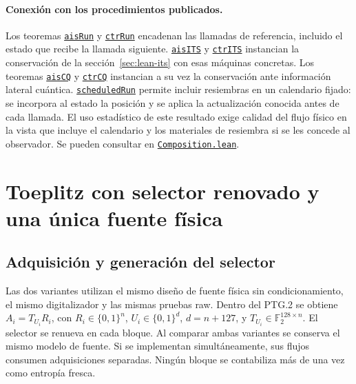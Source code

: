 \documentclass[11pt,a4paper]{article}
\newcommand{\bits}{\{0,1\}}
\newcommand{\proofat}[2]{\href{https://github.com/jordiprga/technical-work/blob/8fec7ab9275547be9d74f394aa4fecbd86a13903/operation-token-burn-2026-11-14/00_coordination/ptg3-its/formal/\csname ptgline:#1\endcsname}{\texttt{#2}}}
\newcommand{\proofmodule}[1]{\href{https://github.com/jordiprga/technical-work/blob/8fec7ab9275547be9d74f394aa4fecbd86a13903/operation-token-burn-2026-11-14/00_coordination/ptg3-its/formal/#1.lean}{\texttt{#1.lean}}}
\begin{document}


\paragraph{Conexión con los procedimientos publicados.}
Los teoremas \proofat{PTG.Composition.aisRun}{aisRun} y \proofat{PTG.Composition.ctrRun}{ctrRun} encadenan las llamadas de referencia,
incluido el estado que recibe la llamada siguiente. \proofat{PTG.Composition.aisITS}{aisITS} y
\proofat{PTG.Composition.ctrITS}{ctrITS} instancian la conservación de la sección~\ref{sec:lean-its}
con esas máquinas concretas. Los teoremas \proofat{PTG.Composition.aisCQ}{aisCQ} y \proofat{PTG.Composition.ctrCQ}{ctrCQ} instancian a su vez
la conservación ante información lateral cuántica. \proofat{PTG.Composition.scheduledRun}{scheduledRun} permite incluir resiembras
en un calendario fijado: se incorpora al estado la posición y se aplica la
actualización conocida antes de cada llamada. El uso estadístico de este
resultado exige calidad del flujo físico en la vista que incluye el calendario
y los materiales de resiembra si se les concede al observador. Se pueden consultar en \proofmodule{Composition}.

\section{Toeplitz con selector renovado y una única fuente física}
\label{sec:toeplitz}

\subsection{Adquisición y generación del selector}

Las dos variantes utilizan el mismo diseño de fuente física sin
condicionamiento, el mismo digitalizador y las mismas pruebas raw.
Dentro del PTG.2 se obtiene
\(A_i=T_{U_i}R_i\), con \(R_i\in\bits^n\),
\(U_i\in\bits^d\), \(d=n+127\), y
\(T_{U_i}\in\mathbb F_2^{128\times n}\). El selector se renueva en
cada bloque. Al comparar ambas variantes se conserva el mismo modelo
de fuente. Si se implementan simultáneamente, sus flujos consumen
adquisiciones separadas. Ningún bloque se contabiliza más de una
vez como entropía fresca.
\end{document}
